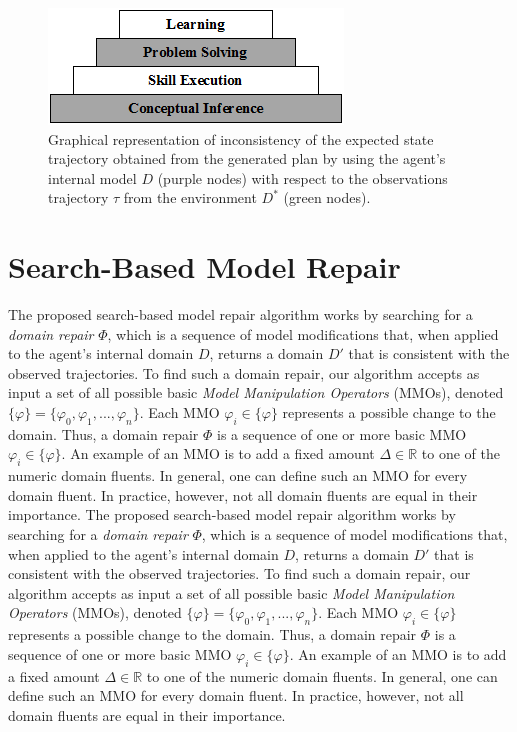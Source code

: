 \documentclass[letterpaper]{article} %
\begin{document}
\begin{figure}
	\centering
	\includegraphics[width=\columnwidth]{cascade.png}
	\caption{Graphical representation of inconsistency of the expected state trajectory obtained from the generated plan by using the agent's internal model $D$ (purple nodes) with respect to the observations trajectory $\tau$ from the environment $D^*$ (green nodes).}
	\label{fig:inconsistency_trajectory}
\end{figure}






\section{Search-Based Model Repair}




The proposed search-based model repair algorithm works by searching for a \emph{domain repair} $\varPhi$, which is a sequence of model modifications that, when applied to the agent's internal domain $D$, returns a domain $D'$ that is consistent with the observed trajectories.
To find such a domain repair, our algorithm accepts as input a set of all possible basic \emph{Model Manipulation Operators} (MMOs), denoted $\{\varphi\} = \{\varphi_0, \varphi_1, ... , \varphi_n\}$. Each MMO $\varphi_i \in \{\varphi\}$ represents a possible change to the domain. Thus, a domain repair $\varPhi$ is a sequence of one or more basic MMO $\varphi_i \in \{\varphi\}$. An example of an MMO is to add a fixed amount $\Delta\in\mathbb{R}$ to one of the numeric domain fluents.
In general, one can define such an MMO for every domain fluent. In practice, however, not all domain fluents are equal in their importance.
The proposed search-based model repair algorithm works by searching for a \emph{domain repair} $\varPhi$, which is a sequence of model modifications that, when applied to the agent's internal domain $D$, returns a domain $D'$ that is consistent with the observed trajectories.
To find such a domain repair, our algorithm accepts as input a set of all possible basic \emph{Model Manipulation Operators} (MMOs), denoted $\{\varphi\} = \{\varphi_0, \varphi_1, ... , \varphi_n\}$. Each MMO $\varphi_i \in \{\varphi\}$ represents a possible change to the domain. Thus, a domain repair $\varPhi$ is a sequence of one or more basic MMO $\varphi_i \in \{\varphi\}$. An example of an MMO is to add a fixed amount $\Delta\in\mathbb{R}$ to one of the numeric domain fluents.
In general, one can define such an MMO for every domain fluent. In practice, however, not all domain fluents are equal in their importance.
\end{document}
